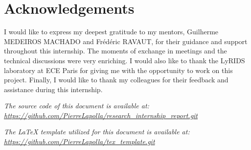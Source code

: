 \maketitle
\tableofcontents


\section*{Acknowledgements}\label{sec:acknowledgements}
I would like to express my deepest gratitude to my mentors, Guilherme MEDEIROS MACHADO and Frédéric RAVAUT, for their
guidance and support throughout this internship.
The moments of exchange in meetings and the technical discussions were very enriching.
I would also like to thank the LyRIDS laboratory at ECE Paris for giving me with the opportunity to work on this project.
Finally, I would like to thank my colleagues for their feedback and assistance during this internship.

\vfill
\begin{center}
    \textit{The source code of this document is available at:
    \url{https://github.com/PierreLapolla/research_internship_report.git}}

    \textit{The \LaTeX{} template utilized for this document is available at:
    \url{https://github.com/PierreLapolla/tex_template.git}}
\end{center}
\newpage